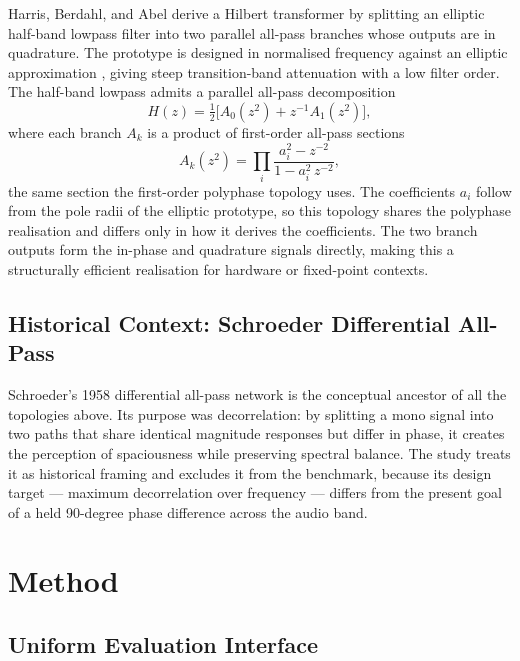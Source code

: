 \documentclass[11pt,a4paper]{article}
\begin{document}
Harris, Berdahl, and Abel \cite{HarrisBerdahlAbel2010} derive a Hilbert
transformer by splitting an elliptic half-band lowpass filter into two
parallel all-pass branches whose outputs are in quadrature.
The prototype is designed in normalised frequency against an elliptic
approximation \cite{SchusslerSteffen1998}, giving steep transition-band
attenuation with a low filter order.
The half-band lowpass admits a parallel all-pass decomposition
\begin{equation}
H(z) = \tfrac{1}{2}\big[A_0(z^2) + z^{-1} A_1(z^2)\big],
\end{equation}
where each branch $A_k$ is a product of first-order all-pass sections
\begin{equation}
A_k(z^2) = \prod_i \frac{a_i^2 - z^{-2}}{1 - a_i^2\,z^{-2}},
\end{equation}
the same section the first-order polyphase topology uses.
The coefficients $a_i$ follow from the pole radii of the elliptic prototype,
so this topology shares the polyphase realisation and differs only in how it
derives the coefficients.
The two branch outputs form the in-phase and quadrature signals directly,
making this a structurally efficient realisation for hardware or fixed-point
contexts.

\subsection{Historical Context: Schroeder Differential All-Pass}

Schroeder's 1958 differential all-pass network is the conceptual ancestor of
all the topologies above.
Its purpose was decorrelation: by splitting a mono signal into two paths that
share identical magnitude responses but differ in phase, it creates the
perception of spaciousness while preserving spectral balance.
The study treats it as historical framing and excludes it from the benchmark, because
its design target — maximum decorrelation over frequency — differs from the
present goal of a held 90-degree phase difference across the audio band.

\section{Method}

\subsection{Uniform Evaluation Interface}
\end{document}
